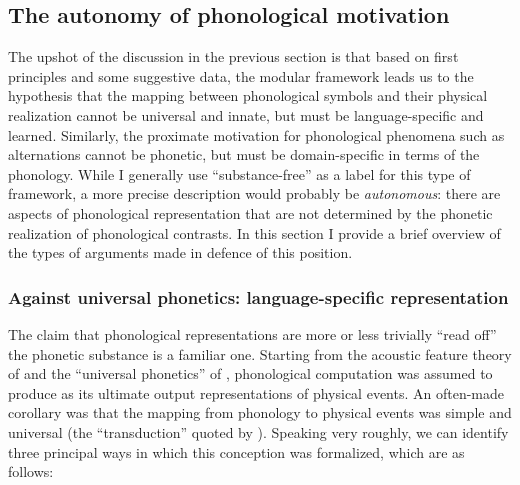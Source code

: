 \subsection{The autonomy of phonological motivation}
\label{sec:autonomous-phonology}

The upshot of the discussion in the previous section is that based on first principles and some suggestive data, the modular framework leads us to the hypothesis that the mapping between phonological symbols and their physical realization cannot be universal and innate, but must be language\hyp specific and learned. Similarly, the proximate motivation for phonological phenomena such as alternations cannot be phonetic, but must be domain\hyp specific in terms of the phonology. While I generally use \enquote{substance\hyp free} as a label for this type of framework, a more precise description would probably be \emph{autonomous}: there are aspects of phonological representation that are not determined by the phonetic realization of phonological contrasts. In this section I provide a brief overview of the types of arguments made in defence of this position.

\subsubsection{Against universal phonetics: language\hyp specific representation}
\label{sec:against-univ-phon}

The claim that phonological representations are more or less trivially \enquote{read off} the phonetic substance is a familiar one. Starting from the acoustic feature theory of \citet{jfh} and the \enquote{universal phonetics} of \citet{spe}, phonological computation was assumed to produce as its ultimate output representations of physical events. An often\hyp made corollary was that the mapping from phonology to physical events was simple and universal (\cf the \enquote{transduction} quoted by \citealp{hale-kissock-reiss,hale-reiss2008}). Speaking very roughly, we can identify three principal ways in which this conception was formalized, which are as follows:

